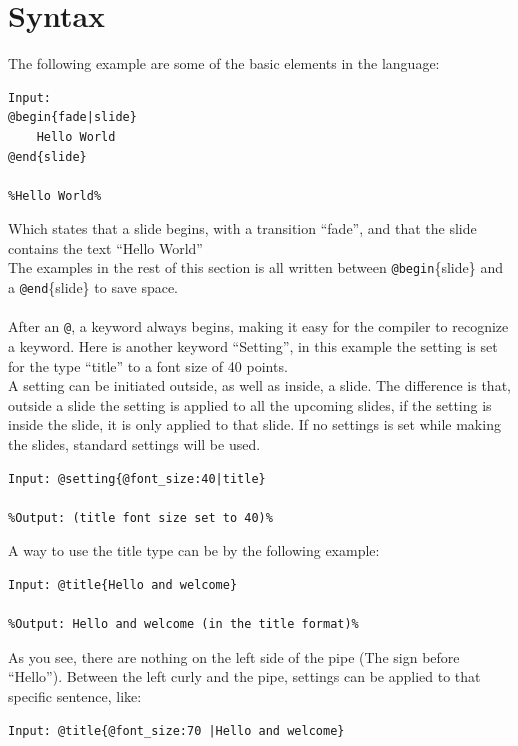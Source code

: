 \chapter{Syntax}
\label{SSyntax}
The following example are some of the basic elements in the language:
\begin{lstlisting}[frame=single]
Input:
@begin{fade|slide}
    Hello World
@end{slide}

%Hello World%
\end{lstlisting}

Which states that a slide begins, with a transition ``fade'', and that the slide contains the text ``Hello World'' \\
The examples in the rest of this section is all written between \texttt{@begin}\{slide\} and a \texttt{@end}\{slide\} to save space.
\\ \\
After an \texttt{@}, a keyword always begins, making it easy for the compiler to recognize a keyword.
Here is another keyword ``Setting'', in this example the setting is set for the type ``title'' to a font size of 40 points. \\
A setting can be initiated outside, as well as inside, a slide. The difference is that, outside a slide the setting is applied to all the upcoming slides, if the setting is inside the slide, it is only applied to that slide. If no settings is set while making the slides, standard settings will be used.

\begin{lstlisting}[frame=single]
Input: @setting{@font_size:40|title}

%Output: (title font size set to 40)%
\end{lstlisting}

A way to use the title type can be by the following example:\\

\begin{lstlisting}[frame=single]
Input: @title{Hello and welcome}

%Output: Hello and welcome (in the title format)%
\end{lstlisting}

As you see, there are nothing on the left side of the pipe (The sign before ``Hello''). Between the left curly and the pipe, settings can be applied to that specific sentence, like:\\

\begin{lstlisting}[frame=single]
Input: @title{@font_size:70 |Hello and welcome}
\end{lstlisting}

